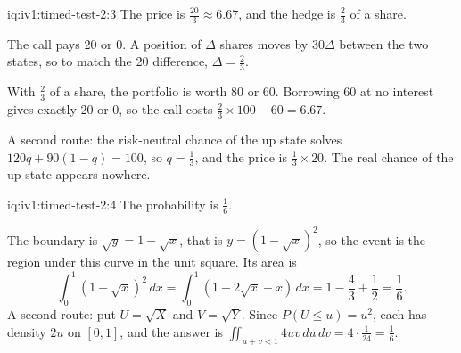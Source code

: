 \begin{solution}{iq:iv1:timed-test-2:3}
The price is $\frac{20}{3} \approx 6.67$, and the hedge is $\frac23$ of a share.

The call pays 20 or 0. A position of $\Delta$ shares moves by $30\Delta$ between the two states, so to match the 20 difference, $\Delta = \frac23$.

With $\frac23$ of a share, the portfolio is worth 80 or 60. Borrowing 60 at no interest gives exactly 20 or 0, so the call costs $\frac23 \times 100 - 60 = 6.67$.

A second route: the risk-neutral chance of the up state solves $120q + 90(1 - q) = 100$, so $q = \frac13$, and the price is $\frac13 \times 20$. The real chance of the up state appears nowhere.

\end{solution}

\enlargethispage{-3\baselineskip}%
\begin{solution}{iq:iv1:timed-test-2:4}
The probability is $\frac16$.

The boundary is $\sqrt{y} = 1 - \sqrt{x}$, that is $y = (1 - \sqrt{x})^2$, so the event is the region under this curve in the unit square. Its area is
\[
\int_0^1(1 - \sqrt{x})^2\,dx = \int_0^1(1 - 2\sqrt{x} + x)\,dx = 1 - \frac43 + \frac12 = \frac16.
\]
A second route: put $U = \sqrt{X}$ and $V = \sqrt{Y}$. Since $P(U \le u) = u^2$, each has density $2u$ on $[0, 1]$, and the answer is $\iint_{u + v < 1}4uv\,du\,dv = 4 \cdot \frac{1}{24} = \frac16$.

\end{solution}

